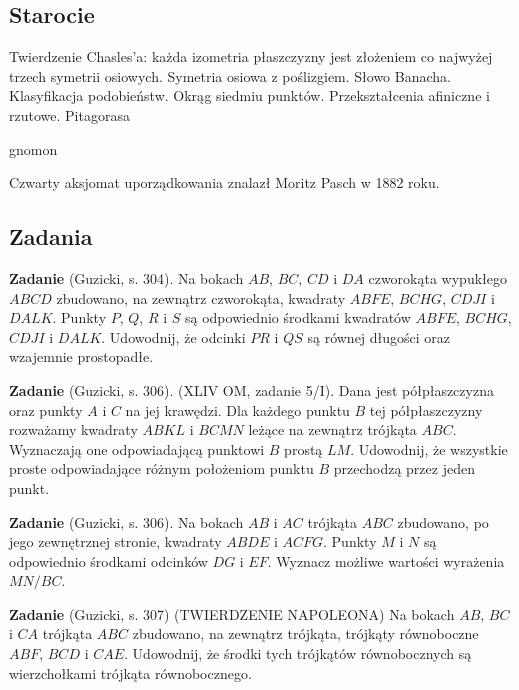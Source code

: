 \subsection{Starocie}
Twierdzenie Chasles'a: każda izometria płaszczyzny jest złożeniem co najwyżej trzech symetrii osiowych.
Symetria osiowa z poślizgiem.
Słowo Banacha.
Klasyfikacja podobieństw.
Okrąg siedmiu punktów. %
Przekształcenia afiniczne i rzutowe.
Pitagorasa %

gnomon %

Czwarty aksjomat uporządkowania znalazł Moritz Pasch \cite{pasch_1882} w 1882 roku.

\subsection{Zadania}
\textbf{Zadanie} (Guzicki, s. 304).
Na bokach $AB$, $BC$, $CD$ i $DA$ czworokąta wypukłego $ABCD$ zbudowano, na zewnątrz czworokąta, kwadraty $ABFE$, $BCHG$, $CDJI$ i $DALK$.
Punkty $P$, $Q$, $R$ i $S$ są odpowiednio środkami kwadratów $ABFE$, $BCHG$, $CDJI$ i $DALK$.
Udowodnij, że odcinki $PR$ i $QS$ są równej długości oraz wzajemnie prostopadłe.

\textbf{Zadanie} (Guzicki, s. 306).
(XLIV OM, zadanie 5/I).
Dana jest półpłaszczyzna oraz punkty $A$ i $C$ na jej krawędzi.
Dla każdego punktu $B$ tej półpłaszczyzny rozważamy kwadraty $ABKL$ i $BCMN$ leżące na zewnątrz trójkąta $ABC$.
Wyznaczają one odpowiadającą punktowi $B$ prostą $LM$.
Udowodnij, że wszystkie proste odpowiadające różnym położeniom punktu $B$ przechodzą przez jeden punkt.

\textbf{Zadanie} (Guzicki, s. 306).
Na bokach $AB$ i $AC$ trójkąta $ABC$ zbudowano, po jego zewnętrznej stronie, kwadraty $ABDE$ i $ACFG$.
Punkty $M$ i $N$ są odpowiednio środkami odcinków $DG$ i $EF$.
Wyznacz możliwe wartości wyrażenia $MN / BC$.

\textbf{Zadanie} (Guzicki, s. 307)
(TWIERDZENIE NAPOLEONA)
Na bokach $AB$, $BC$ i $CA$ trójkąta $ABC$ zbudowano, na zewnątrz trójkąta, trójkąty równoboczne $ABF$, $BCD$ i $CAE$.
Udowodnij, że środki tych trójkątów równobocznych są wierzchołkami trójkąta równobocznego.

